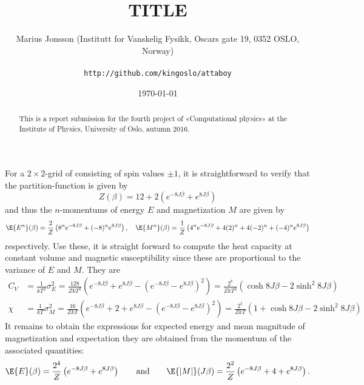 \documentclass[11pt,english,a4paper]{article}
\author{\normalsize Marius Jonsson (Institutt for Vanskelig Fysikk, Oscars gate 19, 0352 OSLO, Norway) \\\\
\vspace{5px}
\normalsize \texttt{http://github.com/kingoslo/attaboy}}
\title{\bf \uppercase{TiTlE}}
\date{\normalsize \today}
\begin{document}
\maketitle
\begin{abstract} \normalsize This is a report submission for the fourth project of «Computational physics» at the Institute of Physics, University of Oslo, autumn 2016.
\end{abstract}
\lstset{
  xleftmargin=.2\textwidth, xrightmargin=.2\textwidth
}
For a $2 \times 2$-grid of consisting of spin values $\pm 1$, it is straightforward to verify that the partition-function is given by
\[
Z(\beta) = 12 + 2\left( e^{ -8 J\beta} + e^{ 8 J\beta} \right)
\]
and thus the $n$-momentums of energy $E$ and magnetization $M$ are given by
\[
\E{E^n}(\beta) = \frac{2}{Z}\left( 8^n e^{ -8 J\beta} + (-8)^n e^{ 8 J\beta}  \right), \quad \E{M^n}(\beta) = \frac{1}{Z}\left( 4^n e^{ -8 J\beta} + 4(2)^n + 4(-2)^n + (-4)^n e^{ 8 J\beta}  \right)
\]
respectively. Use these, it is straight forward to compute the heat capacity at constant volume and magnetic susceptibility since these are proportional to the variance of $E$ and $M$. They are
\begin{align*}
C_V &= \frac{1}{kT^2}\sigma_E^2 = \frac{128}{ZkT^2}\left( e^{ -8 J\beta} + e^{ 8J\beta}
-
\left(e^{ -8 J\beta} - e^{ 8 J\beta}\right)^2 \right) = \frac{2^8}{ZkT^2}\left(  \cosh 8 J\beta
-
2 \sinh^2 8 J\beta \right) \\
\chi &= \frac{1}{kT} \sigma_M^2 = \frac{16}{ZkT} \left( e^{ -8 J\beta} + 2 + e^{ 8 J\beta} - \left( e^{ -8 J\beta} - e^{ 8 J\beta} \right)^2 \right) = \frac{2^5}{ZkT}\left( 1 + \cosh 8 J\beta - 2 \sinh^2 8 J\beta \right)
\end{align*}
It remains to obtain the expressions for expected energy and mean magnitude of magnetization and expectation they are obtained from the momentum of the associated quantities:
\[
\E{E}(\beta) = \frac{2^4}{Z}\left( e^{ -8 J\beta} + e^{ 8 J\beta}  \right) \qquad \text{and} \qquad \E{|M|}(J\beta) = \frac{2^2}{Z}\left(  e^{ -8 J\beta} + 4 +  e^{ 8 J\beta} \right).
\]
\printbibliography
\end{document}
